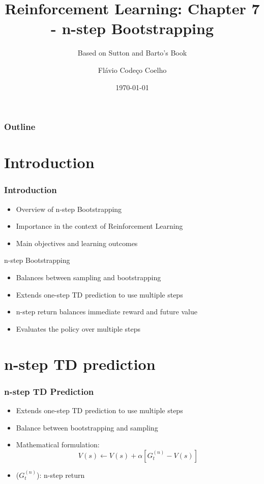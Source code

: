 \documentclass{beamer}
\title{Reinforcement Learning: Chapter 7 - n-step Bootstrapping}
\subtitle{Based on Sutton and Barto's Book}
\author{Flávio Codeço Coelho}
\date{\today}
\begin{document}
    \frame{\titlepage}


    \begin{frame}
        \frametitle{Outline}
        \tableofcontents
    \end{frame}


    \section{Introduction}
    \begin{frame}
        \frametitle{Introduction}
        \begin{itemize}
            \item Overview of n-step Bootstrapping
            \item Importance in the context of Reinforcement Learning
            \item Main objectives and learning outcomes
        \end{itemize}
    \end{frame}

    \begin{frame}{n-step Bootstrapping}
        \begin{itemize}
            \item Balances between sampling and bootstrapping
            \item Extends one-step TD prediction to use multiple steps
            \item n-step return balances immediate reward and future value
            \item Evaluates the policy over multiple steps
        \end{itemize}
    \end{frame}


    \section{n-step TD prediction}
    \begin{frame}
        \frametitle{n-step TD Prediction}
        \begin{itemize}
            \item Extends one-step TD prediction to use multiple steps
            \item Balance between bootstrapping and sampling
            \item Mathematical formulation:
            $$
            V(s) \leftarrow V(s) + \alpha [G_t^{(n)} - V(s)]
            $$
            \item ($G_t^{(n)}$): n-step return
        \end{itemize}
    \end{frame}
\end{document}
